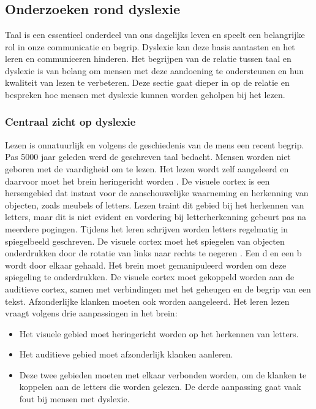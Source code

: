 \chapter{}%
\label{ch:stand-van-zaken}


\section{Onderzoeken rond dyslexie}

Taal is een essentieel onderdeel van ons dagelijks leven en speelt een belangrijke rol in onze communicatie en begrip. Dyslexie kan deze basis aantasten en het leren en communiceren hinderen. Het begrijpen van de relatie tussen taal en dyslexie is van belang om mensen met deze aandoening te ondersteunen en hun kwaliteit van lezen te verbeteren. Deze sectie gaat dieper in op de relatie en bespreken hoe mensen met dyslexie kunnen worden geholpen bij het lezen.

\subsection{Centraal zicht op dyslexie}

Lezen is onnatuurlijk en volgens de geschiedenis van de mens een recent begrip. Pas 5000 jaar geleden werd de geschreven taal bedacht. Mensen worden niet geboren met de vaardigheid om te lezen. Het lezen wordt zelf aangeleerd en daarvoor moet het brein heringericht worden \autocite{Bonte2020, VanDerMeer2022}. De visuele cortex is een hersengebied dat instaat voor de aanschouwelijke waarneming en herkenning van objecten, zoals meubels of letters. Lezen traint dit gebied bij het herkennen van letters, maar dit is niet evident en vordering bij letterherkenning gebeurt pas na meerdere pogingen. Tijdens het leren schrijven worden letters regelmatig in spiegelbeeld geschreven. De visuele cortex moet het spiegelen van objecten onderdrukken door de rotatie van links naar rechts te negeren \autocite{Bonte2020, Romanovska2021}. Een d en een b wordt door elkaar gehaald. Het brein moet gemanipuleerd worden om deze spiegeling te onderdrukken. De visuele cortex moet gekoppeld worden aan de auditieve cortex, samen met verbindingen met het geheugen en de begrip van een tekst. Afzonderlijke klanken moeten ook worden aangeleerd. Het leren lezen vraagt volgens \textcite{Bonte2020} drie aanpassingen in het brein:

\begin{itemize}
	\item Het visuele gebied moet heringericht worden op het herkennen van letters.
	\item Het auditieve gebied moet afzonderlijk klanken aanleren.
	\item Deze twee gebieden moeten met elkaar verbonden worden, om de klanken te koppelen aan de letters die worden gelezen. De derde aanpassing gaat vaak fout bij mensen met dyslexie. 
\end{itemize}
 
